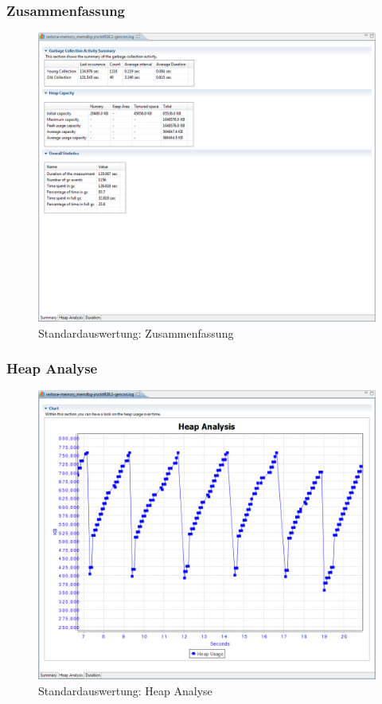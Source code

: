 \subsubsection{Zusammenfassung}
 \begin{figure}[H]
  	\centering
    	\includegraphics[width=15cm]{images/tutorial_standardreport_statistics}
        	\caption{Standardauswertung: Zusammenfassung}
\end{figure}

\subsubsection{Heap Analyse}
 \begin{figure}[H]
  	\centering
    	\includegraphics[width=15cm]{images/tutorial_standardreport_heapanalysis}
        	\caption{Standardauswertung: Heap Analyse}
\end{figure}

